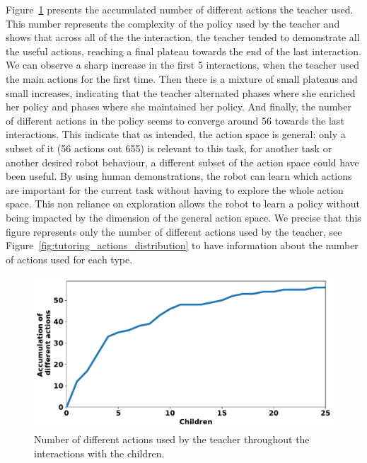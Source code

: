 Figure~\ref{fig:tutoring_actions} presents the accumulated number of different actions the teacher used. This number represents the complexity of the policy used by the teacher and shows that across all of the the interaction, the teacher tended to demonstrate all the useful actions, reaching a final plateau towards the end of the last interaction. We can observe a sharp increase in the first 5 interactions, when the teacher used the main actions for the first time. Then there is a mixture of small plateaus and small increases, indicating that the teacher alternated phases where she enriched her policy and phases where she maintained her policy. And finally, the number of different actions in the policy seems to converge around 56 towards the last interactions. This indicate that as intended, the action space is general: only a subset of it (56 actions out 655) is relevant to this task, for another task or another desired robot behaviour, a different subset of the action space could have been useful. By using human demonstrations, the robot can learn which actions are important for the current task without having to explore the whole action space. This non reliance on exploration allows the robot to learn a policy without being impacted by the dimension of the general action space. We precise that this figure represents only the number of different actions used by the teacher, see Figure~\ref{fig:tutoring_actions_distribution} to have information about the number of actions used for each type.

\begin{figure}[ht]
	\includegraphics[width=.85\linewidth]{./number_actions.pdf}
	\centering
	\caption{Number of different actions used by the teacher throughout the interactions with the children.}
	\label{fig:tutoring_actions}
\end{figure}


